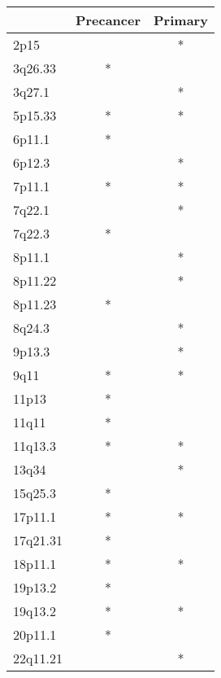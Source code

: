 \begin{tabular}{lcc}
\toprule
{} & Precancer & Primary \\
\midrule
2p15     &           &       * \\
3q26.33  &         * &         \\
3q27.1   &           &       * \\
5p15.33  &         * &       * \\
6p11.1   &         * &         \\
6p12.3   &           &       * \\
7p11.1   &         * &       * \\
7q22.1   &           &       * \\
7q22.3   &         * &         \\
8p11.1   &           &       * \\
8p11.22  &           &       * \\
8p11.23  &         * &         \\
8q24.3   &           &       * \\
9p13.3   &           &       * \\
9q11     &         * &       * \\
11p13    &         * &         \\
11q11    &         * &         \\
11q13.3  &         * &       * \\
13q34    &           &       * \\
15q25.3  &         * &         \\
17p11.1  &         * &       * \\
17q21.31 &         * &         \\
18p11.1  &         * &       * \\
19p13.2  &         * &         \\
19q13.2  &         * &       * \\
20p11.1  &         * &         \\
22q11.21 &           &       * \\
\bottomrule
\end{tabular}
